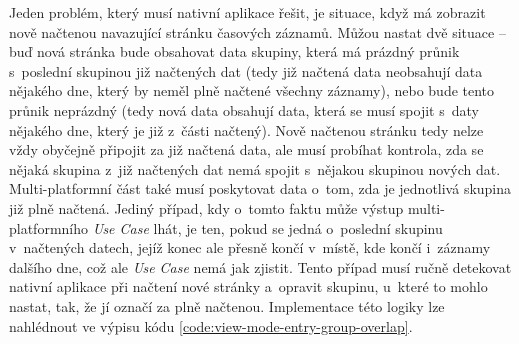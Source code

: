 Jeden problém, který musí nativní aplikace řešit, je situace, když má zobrazit nově načtenou navazující stránku časových záznamů. Můžou nastat dvě situace – buď nová stránka bude obsahovat data skupiny, která má prázdný průnik s~poslední skupinou již načtených dat (tedy již načtená data neobsahují data nějakého dne, který by neměl plně načtené všechny záznamy), nebo bude tento průnik neprázdný (tedy nová data obsahují data, která se musí spojit s~daty nějakého dne, který je již z~části načtený). Nově načtenou stránku tedy nelze vždy obyčejně připojit za již načtená data, ale musí probíhat kontrola, zda se nějaká skupina z~již načtených dat nemá spojit s~nějakou skupinou nových dat. Multi-platformní část také musí poskytovat data o~tom, zda je jednotlivá skupina již plně načtená. Jediný případ, kdy o~tomto faktu může výstup multi-platformního \emph{Use Case} lhát, je ten, pokud se jedná o~poslední skupinu v~načtených datech, jejíž konec ale přesně končí v~místě, kde končí i~záznamy dalšího dne, což ale \emph{Use Case} nemá jak zjistit. Tento případ musí ručně detekovat nativní aplikace při načtení nové stránky a~opravit skupinu, u~které to mohlo nastat, tak, že jí označí za plně načtenou. Implementace této logiky lze nahlédnout ve výpisu kódu \ref{code:view-mode-entry-group-overlap}.

